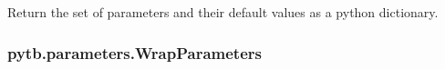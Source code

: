 \documentclass[letterpaper,10pt,english,openany,oneside]{sphinxmanual}
\begin{document}
\begin{fulllineitems}
\begin{fulllineitems}
\label{\detokenize{api/pytb.parameters.TBParameters.get_params:pytb.parameters.TBParameters.get_params}}
\pysigstartsignatures
{}
\pysigstopsignatures
\sphinxAtStartPar
Return the set of parameters and their default values
as a python dictionary.

\end{fulllineitems}


\end{fulllineitems}


\sphinxstepscope


\subsubsection{pytb.parameters.WrapParameters}
\label{\detokenize{api/pytb.parameters.WrapParameters:pytb-parameters-wrapparameters}}\label{\detokenize{api/pytb.parameters.WrapParameters::doc}}
\end{document}
